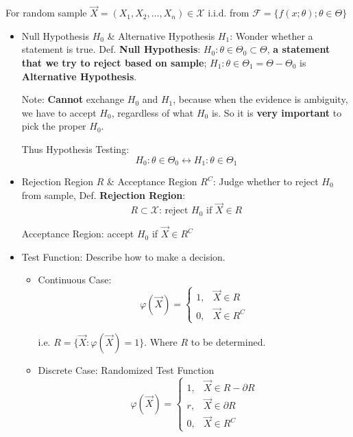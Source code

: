     For random sample $\vec{X}=(X_1,X_2,\ldots,X_n)\in\mathscr{X}$ i.i.d. from $\mathscr{F}=\{f(x;\theta);\theta\in\Theta\}$
    \begin{itemize}[topsep = -3 pt]
        \item Null Hypothesis $H_0$ \& Alternative Hypothesis $H_1$: Wonder whether a statement is true. Def. \textbf{Null Hypothesis}: $H_0:\theta\in\Theta_0\subset\Theta$, \textbf{a statement that we try to reject based on sample}; $H_1:\theta\in\Theta_1=\Theta-\Theta_0$ is \textbf{Alternative Hypothesis}.
        
\begin{point}
    Note: \textbf{Cannot} exchange $ H_0 $ and $ H_1 $, because when the evidence is ambiguity, we have to accept $ H_0 $, regardless of what $ H_0 $ is. So it is \textbf{very important} to pick the proper $ H_0 $.
\end{point}


        Thus Hypothesis Testing:
        \[
            H_0:\theta\in\Theta_0\longleftrightarrow H_1:\theta\in\Theta_1
        \]
        
        \item Rejection Region $R$ \& Acceptance Region $R^C$: Judge whether to reject $H_0$ from sample, Def. \textbf{Rejection Region}:
        \[R\subset\mathscr{X}\text{: reject } H_0 \text{ if } \vec{X}\in R\]

        Acceptance Region: accept $H_0$ if $\vec{X}\in R^C$
        \item Test Function: Describe how to make a decision.
        \begin{itemize}
            \item Continuous Case:
        \[
            \varphi(\vec{X})=\begin{cases}
                1,&\vec{X}\in R\\
                0,&\vec{X}\in R^C
            \end{cases}
        \]

        i.e. $R=\{\vec{X}:\varphi(\vec{X})=1\}$. Where $R$ to be determined.

        \item Discrete Case: Randomized Test Function
        \[
        \varphi(\vec{X})=\begin{cases}
            1,&\vec{X}\in R-\partial R\\
            r,&\vec{X}\in \partial R\\
            0,&\vec{X}\in R^C
        \end{cases}    
        \]


\end{itemize}
\end{itemize}
